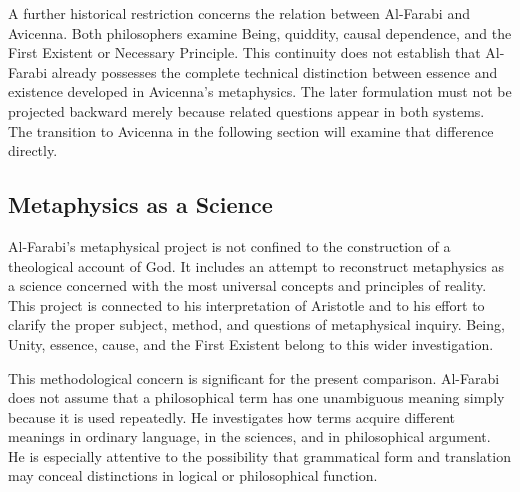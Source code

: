 \label{para:VS.B01.P01.C08.S12.SS02.P005}

A further historical restriction concerns the
relation between Al-Farabi and Avicenna. Both
philosophers examine Being, quiddity, causal
dependence, and the First Existent or Necessary
Principle. This continuity does not establish
that Al-Farabi already possesses the complete
technical distinction between essence and
existence developed in Avicenna's metaphysics.
The later formulation must not be projected
backward merely because related questions
appear in both systems. The transition to
Avicenna in the following section will examine
that difference directly.



\subsection{Metaphysics as a Science}
\label{subsec:ch08-farabi-metaphysics-science}

\label{para:VS.B01.P01.C08.S12.SS03.P001}

Al-Farabi's metaphysical project is not confined
to the construction of a theological account
of God. It includes an attempt to reconstruct
metaphysics as a science concerned with the
most universal concepts and principles of
reality. This project is connected to his
interpretation of Aristotle and to his effort
to clarify the proper subject, method, and
questions of metaphysical inquiry. Being,
Unity, essence, cause, and the First Existent
belong to this wider investigation.
\citep[secs.~1--2]{MennAlFarabiMetaphysicsSEP2026}

\label{para:VS.B01.P01.C08.S12.SS03.P002}

This methodological concern is significant
for the present comparison. Al-Farabi does
not assume that a philosophical term has
one unambiguous meaning simply because it
is used repeatedly. He investigates how
terms acquire different meanings in ordinary
language, in the sciences, and in philosophical
argument. He is especially attentive to the
possibility that grammatical form and
translation may conceal distinctions in
logical or philosophical function.
\citep[secs.~3.1--3.3]{MennAlFarabiMetaphysicsSEP2026}

